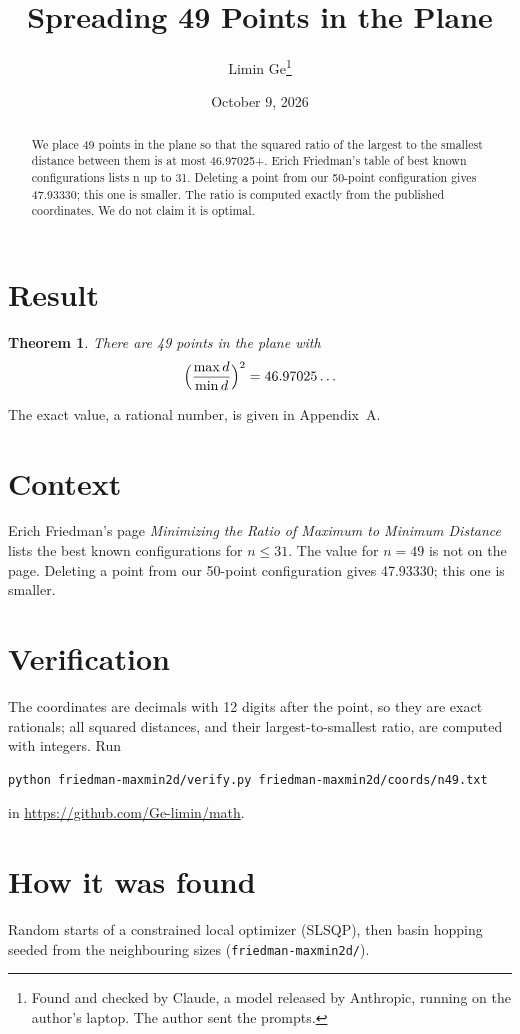 \documentclass[11pt,a4paper]{article}
\title{Spreading 49 Points in the Plane}
\author{Limin Ge\thanks{Found and checked by Claude, a model released by Anthropic, running on the author's laptop. The author sent the prompts.}}
\date{October 9, 2026}
\newtheorem*{theorem}{Theorem}
\begin{document}
\maketitle
\begin{abstract}
We place 49 points in the plane so that the squared ratio of the largest to the smallest distance between them is at most 46.97025+. Erich Friedman's table of best known configurations lists n up to 31. Deleting a point from our 50-point configuration gives 47.93330; this one is smaller. The ratio is computed exactly from the published coordinates. We do not claim it is optimal.
\end{abstract}

\section{Result}
\begin{theorem}
There are 49 points in the plane with
\[ \Bigl(\frac{\max d}{\min d}\Bigr)^2 = 46.97025\ldots \]
\end{theorem}
The exact value, a rational number, is given in Appendix~A.


\section{Context}
Erich Friedman's page \emph{Minimizing the Ratio of Maximum to Minimum Distance} lists the best known configurations for $n\le 31$. The value for $n=49$ is not on the page. Deleting a point from our 50-point configuration gives 47.93330; this one is smaller.


\section{Verification}
The coordinates are decimals with 12 digits after the point, so they are exact rationals; all squared distances, and their largest-to-smallest ratio, are computed with integers. Run
\begin{verbatim}
python friedman-maxmin2d/verify.py friedman-maxmin2d/coords/n49.txt
\end{verbatim}
in \url{https://github.com/Ge-limin/math}.


\section{How it was found}
Random starts of a constrained local optimizer (SLSQP), then basin hopping seeded from the neighbouring sizes (\texttt{friedman-maxmin2d/}).
\end{document}
